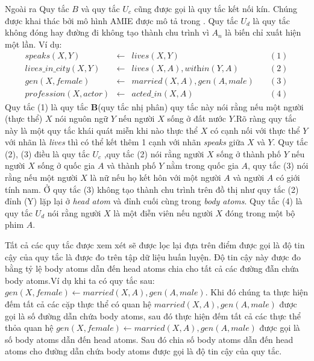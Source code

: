 Ngoài ra Quy tắc \(B\) và quy tắc \(U_c\) cũng được gọi là quy tắc kết nối kín. Chúng được khai thác bởi mô hình  AMIE được mô tả trong \cite{AMIE,galarraga2015fast}. Quy tắc \(U_d\) là quy tắc không đóng hay đường đi không tạo thành chu trình vì \(A_n\) là biến chỉ xuất hiện một lần. Ví dụ:
\[
\begin{matrix}
	\textit{speaks}(X, Y ) & \gets & \textit{lives}(X, Y) & \quad (1) \\
	\textit{lives\_in\_city}(X, Y ) & \gets & \textit{lives}(X, A),\textit{within}(Y, A)  & \quad  (2) \\
	\textit{gen}(X, female) & \gets & \textit{married}(X, A), \textit{gen}(A, male)  & \quad  (3) \\
	\textit{profession}(X, actor) &  \gets & \textit{acted\_in}(X, A)  & \quad (4)
\end{matrix}
\]
Quy tắc (1) là quy tắc \textbf{B}(quy tắc nhị phân) quy tắc này nói rằng nếu một người (thực thể) \(X\) nói nguôn ngữ \(Y\) nếu người \(X\) sống  ở đất nước \(Y\).Rõ ràng quy tắc này là một quy tắc khái quát miễn khi nào thực thể \(X\) có cạnh nối với thực thể \(Y\) với nhãn là \textit{lives} thì có thể kết thêm 1 cạnh với nhãn \textit{speaks} giữa \(X\) và \(Y\). Quy tắc (2), (3) điều là quy tắc \(U_c\) ,quy tắc (2) nói rằng người \(X\) sống ở thành phố \(Y\) nếu người \(X\) sống ở quốc gia \(A\) và thành phố \(Y\) nằm trong quốc gia \(A\), quy tắc (3) nói rằng nếu một người \(X\) là nữ nếu họ kết hôn với một người \(A\) và người \(A\) có giới tính nam. Ở quy tắc (3) không tạo thành chu trình trên đồ thị như quy tắc (2) đỉnh (Y) lặp lại  ở \textit{head atom} và đỉnh cuối cùng trong \textit{body atoms}. Quy tắc (4) là quy tắc \(U_d\) nói rằng người \(X\) là một điễn viên nếu người \(X\) đóng trong một bộ phim \(A\).

Tất cả các quy tắc được xem xét sẽ được lọc lại đựa trên điểm được gọi là độ tin cậy của quy tắc là được đo trên tập dữ liệu huấn luyện. Độ tin cậy này được đo bằng tỷ lệ body atoms dẫn đến head atoms chia cho tất cả các đường đẫn chứa body atoms.Ví dụ khi ta có quy tắc sau:
\(\textit{gen}(X, female) \gets \textit{married}(X, A), \textit{gen}(A, male) \). Khi đó chúng ta thực hiện đếm tất cả các cặp thực thể có quan hệ  \(\textit{married}(X, A), \textit{gen}(A, male) \) được gọi là số đường dẫn chứa body atoms, sau đó thực hiện đếm tất cả các  thực thể thỏa quan hệ \(\textit{gen}(X, female) \gets \textit{married}(X, A), \textit{gen}(A, male) \) được gọi là số body atoms dẫn đến head atoms. Sau đó chia số body atoms dẫn đến head atoms cho  đường dẫn chứa body atoms được gọi là độ tin cậy của quy tắc.

